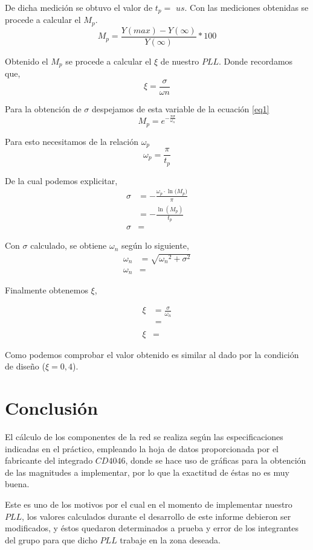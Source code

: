 \documentclass[twocolumn]{article}
\begin{document}
De dicha medición se obtuvo el valor de $t_p = $ $us$. Con las mediciones obtenidas se procede a calcular el $M_p$.
\[ M_p = \frac{Y(max) - Y(\infty)} {Y(\infty)} * 100 \]

Obtenido el $M_p$ se procede a calcular el $\xi$ de nuestro $PLL$. Donde recordamos que,
\[ \xi = \frac{\sigma}{\omega n} \]

Para la obtención de $\sigma$ despejamos de esta variable de la ecuación \textcolor{blue}{\ref{eq1}}
\begin{equation}
	M_{p} = e^{-\frac{\pi \sigma}{\omega_{n}}}
	\label{eq1}
\end{equation}

Para esto necesitamos de la relación $\omega_{p}$
\[
	\omega_{p} = \frac{\pi}{t_{p}}
\] 

De la cual podemos explicitar,
\begin{align*}
	\sigma &= - \frac{\omega_{p} \cdot \ln({M_{p})}}{\pi} \\
		   &= - \frac{\ln(M_{p})}{t_p}\\
	\sigma &=    
\end{align*}

Con $\sigma$ calculado, se obtiene $\omega_{n}$ según lo siguiente,
\begin{align*}
	\omega_{n} &= \sqrt{{\omega_{n}}^{2}+ {\sigma}^{2}} \\
	\omega_{n} &=
\end{align*}

Finalmente obtenemos $\xi$,

\begin{align*}
  \xi &= \frac{\sigma}{\omega_{n}} \\
      &= \frac{}{} \\
  \xi &=
\end{align*}

Como podemos comprobar el valor obtenido es similar al dado por la condición de diseño ($\xi = 0,4$).
 
\section{Conclusión}
El cálculo de los componentes de la red se realiza según las especificaciones indicadas en el práctico, empleando la hoja de datos proporcionada por el fabricante del integrado $CD4046$, donde se hace uso de gráficas para la obtención de las magnitudes a implementar, por lo que la exactitud de éstas no es muy buena.

Este es uno de los motivos por el cual en el momento de implementar nuestro $PLL$, los valores calculados durante el desarrollo de este informe debieron ser modificados, y éstos quedaron determinados a prueba y error de los integrantes del grupo para que dicho $PLL$ trabaje en la zona deseada.
\end{document}
